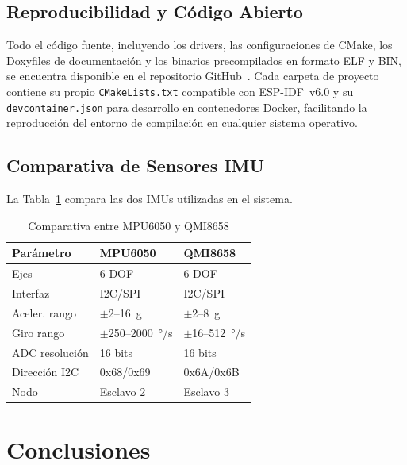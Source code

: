 \documentclass[10pt,twocolumn,a4paper]{article}
\begin{document}
\subsection{Reproducibilidad y Código Abierto}

Todo el código fuente, incluyendo los drivers, las configuraciones de
CMake, los Doxyfiles de documentación y los binarios precompilados en
formato ELF y BIN, se encuentra disponible en el repositorio
GitHub~\cite{repo_github}. Cada carpeta de proyecto contiene su propio
\texttt{CMakeLists.txt} compatible con ESP-IDF~v6.0 y su
\texttt{devcontainer.json} para desarrollo en contenedores Docker,
facilitando la reproducción del entorno de compilación en cualquier
sistema operativo.

\subsection{Comparativa de Sensores IMU}

La Tabla~\ref{tab:imu_comp} compara las dos IMUs utilizadas en el sistema.

\begin{table}[H]
\centering
\caption{Comparativa entre MPU6050 y QMI8658}
\label{tab:imu_comp}
\scriptsize
\begin{tabular}{p{2.2cm}p{2.1cm}p{2.1cm}}
\toprule
\textbf{Parámetro} & \textbf{MPU6050} & \textbf{QMI8658} \\
\midrule
Ejes & 6-DOF & 6-DOF \\
Interfaz & I2C/SPI & I2C/SPI \\
Aceler. rango & $\pm$2--16~g & $\pm$2--8~g \\
Giro rango & $\pm$250--2000~°/s & $\pm$16--512~°/s \\
ADC resolución & 16 bits & 16 bits \\
Dirección I2C & 0x68/0x69 & 0x6A/0x6B \\
Nodo & Esclavo 2 & Esclavo 3 \\
\bottomrule
\end{tabular}
\end{table}

\section{Conclusiones}
\label{sec:conc}
\end{document}
